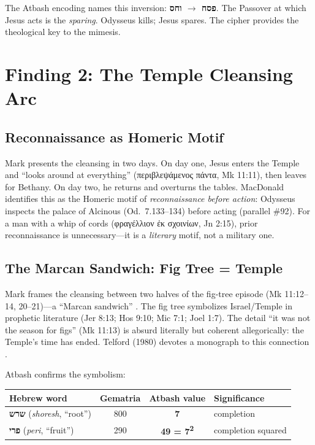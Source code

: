\documentclass[12pt,a4paper]{article}
\begin{document}
The Atbash encoding names this inversion: \textbf{פסח $\to$ וחס}. The Passover at which Jesus acts is the \textit{sparing}. Odysseus kills; Jesus spares. The cipher provides the theological key to the mimesis.

\section{Finding 2: The Temple Cleansing Arc}
\label{sec:temple}

\subsection{Reconnaissance as Homeric Motif}

Mark presents the cleansing in two days. On day one, Jesus enters the Temple and ``looks around at everything'' (περιβλεψάμενος πάντα, Mk 11:11), then leaves for Bethany. On day two, he returns and overturns the tables. MacDonald identifies this as the Homeric motif of \textit{reconnaissance before action}: Odysseus inspects the palace of Alcinous (Od.\ 7.133--134) before acting (parallel \#92). For a man with a whip of cords (φραγέλλιον ἐκ σχοινίων, Jn 2:15), prior reconnaissance is unnecessary---it is a \textit{literary} motif, not a military one.

\subsection{The Marcan Sandwich: Fig Tree = Temple}

Mark frames the cleansing between two halves of the fig-tree episode (Mk 11:12--14, 20--21)---a ``Marcan sandwich'' \parencite{edwards1989}. The fig tree symbolizes Israel/Temple in prophetic literature (Jer 8:13; Hos 9:10; Mic 7:1; Joel 1:7). The detail ``it was not the season for figs'' (Mk 11:13) is absurd literally but coherent allegorically: the Temple's time has ended. Telford (1980) devotes a monograph to this connection \parencite{telford1980}.

Atbash confirms the symbolism:

\begin{center}
\begin{tabular}{lccl}
\toprule
\textbf{Hebrew word} & \textbf{Gematria} & \textbf{Atbash value} & \textbf{Significance} \\
\midrule
\textbf{שרש} (\textit{shoresh}, ``root'') & 800 & \textbf{7} & completion \\
\textbf{פרי} (\textit{peri}, ``fruit'') & 290 & \textbf{49 = 7\textsuperscript{2}} & completion squared \\
\bottomrule
\end{tabular}
\end{center}
\end{document}

